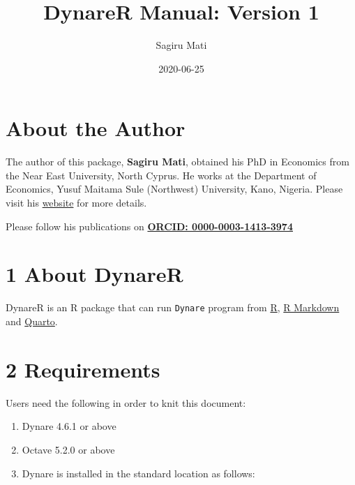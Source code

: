 \documentclass[
  12pt,
  legalpaperpaper,
  DIV=11,
  numbers=noendperiod]{scrartcl}
\title{DynareR Manual: Version 1}
\author{Sagiru Mati}
\date{2020-06-25}
\begin{document}
\maketitle
\ifdefined\Shaded\renewenvironment{Shaded}{\begin{tcolorbox}[breakable, boxrule=0pt, enhanced, borderline west={3pt}{0pt}{shadecolor}, interior hidden, sharp corners, frame hidden]}{\end{tcolorbox}}\fi

\normalsize

\hypertarget{about-the-author}{%
\section{About the Author}\label{about-the-author}}

The author of this package, \textbf{Sagiru Mati}, obtained his PhD in
Economics from the Near East University, North Cyprus. He works at the
Department of Economics, Yusuf Maitama Sule (Northwest) University,
Kano, Nigeria. Please visit his \href{https://smati.com.ng}{website} for
more details.

Please follow his publications on
\href{https://orcid.org/0000-0003-1413-3974}{\textbf{ORCID:
0000-0003-1413-3974}}

\hypertarget{about-dynarer}{%
\section{1 About DynareR}\label{about-dynarer}}

DynareR is an R package that can run \texttt{Dynare} program from
\href{https://cran.rstudio.com/}{R},
\href{https://bookdown.org/yihui/rmarkdown-cookbook/}{R Markdown} and
\href{https://quarto.org}{Quarto}.

\hypertarget{requirements}{%
\section{2 Requirements}\label{requirements}}

Users need the following in order to knit this document:

\begin{enumerate}
\def\labelenumi{\arabic{enumi}.}
\item
  Dynare 4.6.1 or above
\item
  Octave 5.2.0 or above
\item
  Dynare is installed in the standard location as follows:
\end{enumerate}
\end{document}
